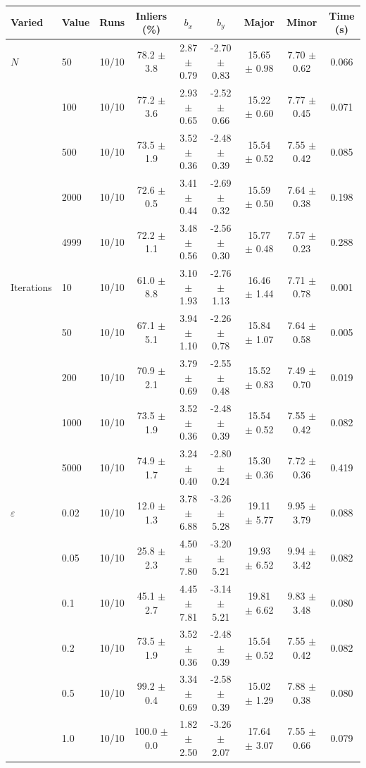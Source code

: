 \begin{tabular}{llccccccc}
\toprule
Varied & Value & Runs & Inliers (\%) & $b_x$ & $b_y$ & Major & Minor & Time (s) \\
\midrule
$N$ & 50 & 10/10 & 78.2 $\pm$ 3.8 & 2.87 $\pm$ 0.79 & -2.70 $\pm$ 0.83 & 15.65 $\pm$ 0.98 & 7.70 $\pm$ 0.62 & 0.066 \\
 & 100 & 10/10 & 77.2 $\pm$ 3.6 & 2.93 $\pm$ 0.65 & -2.52 $\pm$ 0.66 & 15.22 $\pm$ 0.60 & 7.77 $\pm$ 0.45 & 0.071 \\
 & 500 & 10/10 & 73.5 $\pm$ 1.9 & 3.52 $\pm$ 0.36 & -2.48 $\pm$ 0.39 & 15.54 $\pm$ 0.52 & 7.55 $\pm$ 0.42 & 0.085 \\
 & 2000 & 10/10 & 72.6 $\pm$ 0.5 & 3.41 $\pm$ 0.44 & -2.69 $\pm$ 0.32 & 15.59 $\pm$ 0.50 & 7.64 $\pm$ 0.38 & 0.198 \\
 & 4999 & 10/10 & 72.2 $\pm$ 1.1 & 3.48 $\pm$ 0.56 & -2.56 $\pm$ 0.30 & 15.77 $\pm$ 0.48 & 7.57 $\pm$ 0.23 & 0.288 \\
\midrule
Iterations & 10 & 10/10 & 61.0 $\pm$ 8.8 & 3.10 $\pm$ 1.93 & -2.76 $\pm$ 1.13 & 16.46 $\pm$ 1.44 & 7.71 $\pm$ 0.78 & 0.001 \\
 & 50 & 10/10 & 67.1 $\pm$ 5.1 & 3.94 $\pm$ 1.10 & -2.26 $\pm$ 0.78 & 15.84 $\pm$ 1.07 & 7.64 $\pm$ 0.58 & 0.005 \\
 & 200 & 10/10 & 70.9 $\pm$ 2.1 & 3.79 $\pm$ 0.69 & -2.55 $\pm$ 0.48 & 15.52 $\pm$ 0.83 & 7.49 $\pm$ 0.70 & 0.019 \\
 & 1000 & 10/10 & 73.5 $\pm$ 1.9 & 3.52 $\pm$ 0.36 & -2.48 $\pm$ 0.39 & 15.54 $\pm$ 0.52 & 7.55 $\pm$ 0.42 & 0.082 \\
 & 5000 & 10/10 & 74.9 $\pm$ 1.7 & 3.24 $\pm$ 0.40 & -2.80 $\pm$ 0.24 & 15.30 $\pm$ 0.36 & 7.72 $\pm$ 0.36 & 0.419 \\
\midrule
$\varepsilon$ & 0.02 & 10/10 & 12.0 $\pm$ 1.3 & 3.78 $\pm$ 6.88 & -3.26 $\pm$ 5.28 & 19.11 $\pm$ 5.77 & 9.95 $\pm$ 3.79 & 0.088 \\
 & 0.05 & 10/10 & 25.8 $\pm$ 2.3 & 4.50 $\pm$ 7.80 & -3.20 $\pm$ 5.21 & 19.93 $\pm$ 6.52 & 9.94 $\pm$ 3.42 & 0.082 \\
 & 0.1 & 10/10 & 45.1 $\pm$ 2.7 & 4.45 $\pm$ 7.81 & -3.14 $\pm$ 5.21 & 19.81 $\pm$ 6.62 & 9.83 $\pm$ 3.48 & 0.080 \\
 & 0.2 & 10/10 & 73.5 $\pm$ 1.9 & 3.52 $\pm$ 0.36 & -2.48 $\pm$ 0.39 & 15.54 $\pm$ 0.52 & 7.55 $\pm$ 0.42 & 0.082 \\
 & 0.5 & 10/10 & 99.2 $\pm$ 0.4 & 3.34 $\pm$ 0.69 & -2.58 $\pm$ 0.39 & 15.02 $\pm$ 1.29 & 7.88 $\pm$ 0.38 & 0.080 \\
 & 1.0 & 10/10 & 100.0 $\pm$ 0.0 & 1.82 $\pm$ 2.50 & -3.26 $\pm$ 2.07 & 17.64 $\pm$ 3.07 & 7.55 $\pm$ 0.66 & 0.079 \\
\bottomrule
\end{tabular}
